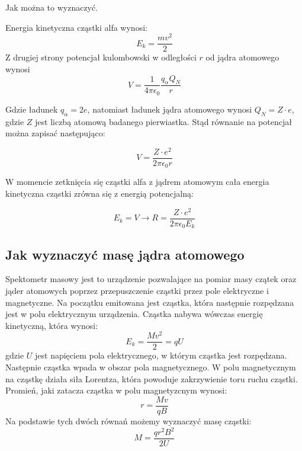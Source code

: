 \documentclass{article}
\begin{document}
Jak można to wyznaczyć.

Energia kinetyczna cząstki alfa wynosi:
\begin{equation}
    E_k = \frac{mv^2}{2}
\end{equation}
Z drugiej strony potencjał kulombowski w odległości $r$ od jądra atomowego wynosi
\begin{equation}
    V = \frac{1}{4\pi \epsilon_0} \frac{q_{\alpha}Q_N}{r}
\end{equation}

Gdzie ładunek $q_{\alpha} = 2e$, natomiast ładunek jądra atomowego wynosi $Q_N = Z\cdot e$, gdzie $Z$ jest liczbą atomową badanego pierwiastka. Stąd równanie na potencjał można zapisać następująco:

\begin{equation}
    V = \frac{Z\cdot e^2}{2\pi \epsilon_0 r}
\end{equation}

W momencie zetknięcia się cząstki alfa z jądrem atomowym cała energia kinetyczna cząstki zrówna się z energią potencjalną:

\begin{equation}
    E_k = V \rightarrow R = \frac{Z \cdot e^2}{2\pi \epsilon_0 E_k}
\end{equation}

\subsection{Jak wyznaczyć masę jądra atomowego}
Spektometr masowy jest to urządzenie pozwalające na pomiar masy czątek oraz jąder atomowych poprzez przepuszczenie cząstki przez pole elektryczne i magnetyczne.
Na początku emitowana jest cząstka, która następnie rozpędzana jest w polu elektrycznym urządzenia. Cząstka nabywa wówczas energię kinetyczną, która wynosi:
\begin{equation}
    E_k = \frac{Mv^2}{2} = qU
\end{equation}
gdzie $U$ jest napięciem pola elektrycznego, w którym cząstka jest rozpędzana.
Następnie cząstka wpada w obszar pola magnetycznego. W polu magnetycznym na cząstkę działa siła Lorentza, która powoduje zakrzywienie toru ruchu cząstki. Promień, jaki zatacza cząstka w polu magnetyzcnym wynosi:
\begin{equation}
    r = \frac{Mv}{qB}
\end{equation}
Na podstawie tych dwóch równań możemy wyznaczyć masę cząstki:
\begin{equation}
    M = \frac{qr^2B^2}{2U}
\end{equation}
\end{document}
